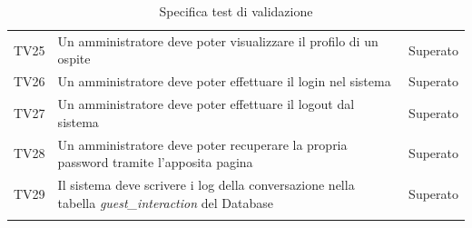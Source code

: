 \documentclass[../PianoDiQualifica_v4.0.0.tex]{subfiles}
\begin{document}
\begin{longtable}[c] { >{\centering\arraybackslash}p{4cm} p{7cm} >{\centering\arraybackslash}p{4cm}}
			\addlinespace[0.3em]
			\midrule
			\addlinespace[0.3em]
			TV25 & Un amministratore deve poter visualizzare il profilo di un ospite & Superato \\
			\addlinespace[0.3em]
			\midrule
			\addlinespace[0.3em]
			TV26 & Un amministratore deve poter effettuare il login nel sistema & Superato \\
			\addlinespace[0.3em]
			\midrule
			\addlinespace[0.3em]
			TV27 & Un amministratore deve poter effettuare il logout dal sistema & Superato \\
			\addlinespace[0.3em]
			\midrule
			\addlinespace[0.3em]
			TV28 & Un amministratore deve poter recuperare la propria password tramite l'apposita pagina & Superato \\
			\addlinespace[0.3em]
			\midrule
			\addlinespace[0.3em]
			TV29 & Il sistema deve scrivere i log della conversazione nella tabella \textit{guest\_interaction} del Database & Superato \\
			\bottomrule
			\caption{Specifica test di validazione}
	\end{longtable}
\end{document}
